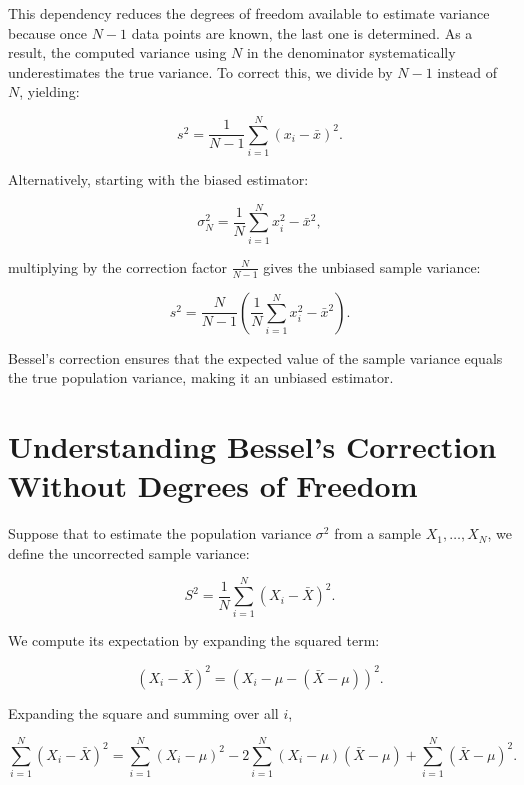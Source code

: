 \documentclass{article}
\begin{document}
This dependency reduces the degrees of freedom available to estimate variance because once \( N-1 \) data points are known, the last one is determined. As a result, the computed variance using \( N \) in the denominator systematically underestimates the true variance. To correct this, we divide by \( N-1 \) instead of \( N \), yielding:

\begin{equation}
    s^2 = \frac{1}{N-1} \sum_{i=1}^{N} (x_i - \bar{x})^2.
\end{equation}

Alternatively, starting with the biased estimator:

\begin{equation}
    \sigma_N^2 = \frac{1}{N} \sum_{i=1}^{N} x_i^2 - \bar{x}^2,
\end{equation}

multiplying by the correction factor \( \frac{N}{N-1} \) gives the unbiased sample variance:

\begin{equation}
    s^2 = \frac{N}{N-1} \left( \frac{1}{N} \sum_{i=1}^{N} x_i^2 - \bar{x}^2 \right).
\end{equation}

Bessel's correction ensures that the expected value of the sample variance equals the true population variance, making it an unbiased estimator.

\section{Understanding Bessel's Correction Without Degrees of Freedom}

Suppose that to estimate the population variance \( \sigma^2 \) from a sample \( X_1, \dots, X_N \), we define the uncorrected sample variance:

\begin{equation}
    S^2 = \frac{1}{N} \sum_{i=1}^{N} (X_i - \bar{X})^2.
\end{equation}

We compute its expectation by expanding the squared term:

\begin{equation}
    (X_i - \bar{X})^2 = (X_i - \mu - (\bar{X} - \mu))^2.
\end{equation}

Expanding the square and summing over all \( i \),

\begin{equation}
    \sum_{i=1}^{N} (X_i - \bar{X})^2 = \sum_{i=1}^{N} (X_i - \mu)^2 - 2 \sum_{i=1}^{N} (X_i - \mu)(\bar{X} - \mu) + \sum_{i=1}^{N} (\bar{X} - \mu)^2.
\end{equation}
\end{document}
